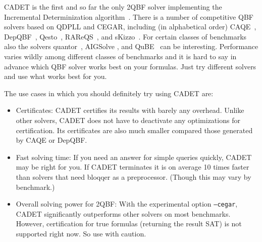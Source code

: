 \documentclass{article}
\begin{document}
CADET is the first and so far the only 2QBF solver implementing the Incremental Determinization algorithm~\cite{RabeSeshia/2016/IncrementalDeterminization}. 
There is a number of competitive QBF solvers based on QDPLL and CEGAR, including (in alphabetical order) CAQE~\cite{RabeTentrup/2015/CAQEACertifyingQBFSolver}, DepQBF~\cite{LonsingBiere/2010/DepQBF}, Qesto~\cite{JanotaM/2015/SolvingQBFByClauseSelection}, RAReQS~\cite{JanotaSilva/2011/AbstractionBasedAlgorithmFor2QBF,JanotaKMC/2012/QBFWithCEGAR}, and sKizzo~\cite{Benedetti/2005/sKizzo}. 
For certain classes of benchmarks also the solvers quantor~\cite{Biere/2004/ResolveAndExpand}, AIGSolve \cite{PigorschScholl/2010/AIGSolve}, and QuBE~\cite{GiunchigliaNT/2001/QuBE} can be interesting. 
Performance varies wildly among different classes of benchmarks and it is hard to say in advance which QBF solver works best on your formulas. 
Just try different solvers and use what works best for you.

The use cases in which you should definitely try using CADET are:
\begin{itemize}
	\item Certificates: CADET certifies its results with barely any overhead. 
		Unlike other solvers, CADET does not have to deactivate any optimizations for certification. 
		Its certificates are also much smaller compared those generated by CAQE or DepQBF. 
	\item Fast solving time: If you need an answer for simple queries quickly, CADET may be right for you. 
		If CADET terminates it is on average 10 times faster than solvers that need bloqqer as a preprocessor. 
		(Though this may vary by benchmark.)
	\item Overall solving power for 2QBF: With the experimental option \texttt{--cegar}, CADET significantly outperforms other solvers on most benchmarks. 
		However, certification for true formulas (returning the result SAT) is not supported right now. So use with caution. 
\end{itemize}




\end{document}
